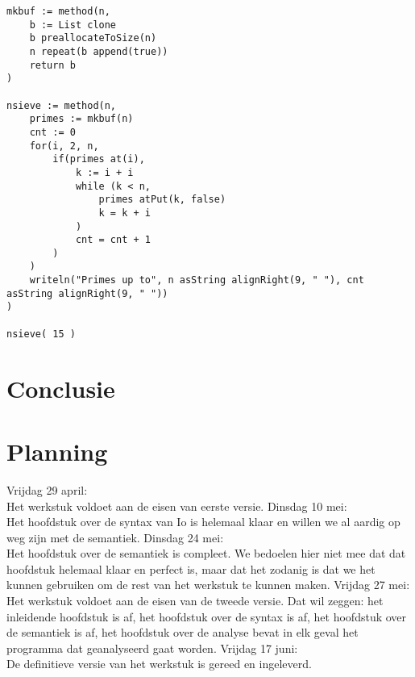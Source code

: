 \documentclass[12pt]{article}
\begin{document}
\begin{lstlisting}[frame=single]
mkbuf := method(n,
	b := List clone
	b preallocateToSize(n)
	n repeat(b append(true))
	return b
)

nsieve := method(n,
	primes := mkbuf(n)
	cnt := 0
	for(i, 2, n,
		if(primes at(i),
			k := i + i
			while (k < n,
				primes atPut(k, false)
				k = k + i
			)
			cnt = cnt + 1
		)
	)
	writeln("Primes up to", n asString alignRight(9, " "), cnt asString alignRight(9, " "))
)

nsieve( 15 )

\end{lstlisting}

\section{Conclusie}

\appendix
\section{Planning}
Vrijdag 29 april: \\Het werkstuk voldoet aan de eisen van eerste versie.\newline\newline %
Dinsdag 10 mei: \\Het hoofdstuk over de syntax van Io is helemaal klaar en willen we al aardig op weg zijn met de semantiek.\newline\newline
Dinsdag 24 mei: \\Het hoofdstuk over de semantiek is compleet. We bedoelen hier niet mee dat dat hoofdstuk helemaal klaar en perfect is, maar
dat het zodanig is dat we het kunnen gebruiken om de rest van het werkstuk te kunnen maken.\newline\newline
Vrijdag 27 mei: \\Het werkstuk voldoet aan de eisen van de tweede versie. Dat wil zeggen: het inleidende hoofdstuk is af, het hoofdstuk over de syntax is af, het hoofdstuk over de semantiek is af, het hoofdstuk over de analyse bevat in elk geval het programma dat geanalyseerd gaat worden.\newline\newline
Vrijdag 17 juni: \\De definitieve versie van het werkstuk is gereed en ingeleverd.
\end{document}
